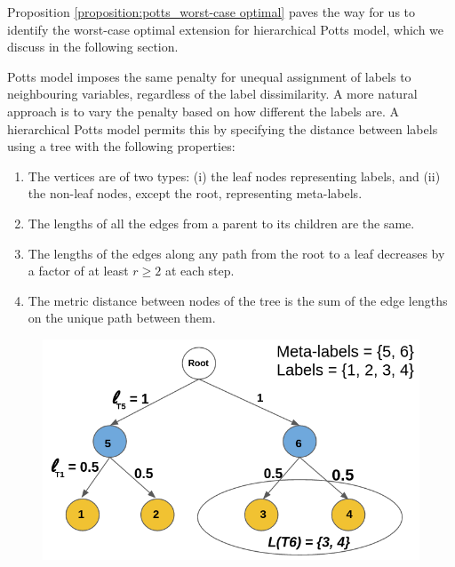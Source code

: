 Proposition \ref{proposition:potts_worst-case optimal} paves the way for us to
identify the worst-case optimal extension for hierarchical Potts model, which
we discuss in the following section.

\label{sec:rhst_worst-case optimal}

Potts model imposes the same penalty for unequal assignment of labels to neighbouring variables, regardless of the label dissimilarity. A more natural approach is to vary the penalty based on how different the labels are. A hierarchical Potts model permits this by specifying the distance between labels using a tree with the following properties:
\vspace{2mm}
\begin{enumerate}
  \itemsep+1em 
\item The vertices are of two types: (i) the leaf nodes representing labels, and (ii) the non-leaf nodes, except the root, representing meta-labels.
\item The lengths of all the edges from a parent to its children are the same.
\item The lengths of the edges along any path from the root to a leaf decreases by a factor of at least $r \geq 2$ at each step.
\item The metric distance between nodes of the tree is the sum of the edge lengths on the unique path between them. 
\end{enumerate}
\vspace{2mm}
%
\begin{figure}
\centering
\includegraphics[scale = 0.30]{./figures/rhst_notation.png}
\label{fig:rhst}
\end{figure}

